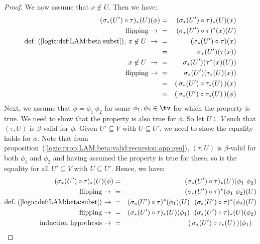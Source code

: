 \begin{proof}
    We now assume that $x\not\in U$. Then we have:
        \begin{eqnarray*}(\sigma_{*}(U')\circ\tau)_{*}(U)(\phi)
            &=&(\sigma_{*}(U')\circ\tau)_{*}(U)(x)\\
            \mbox{flipping\ $\to$\ }
            &=&(\sigma_{*}(U')\circ\tau)^{*}(x)(U)\\
            \mbox{def.~(\ref{logic:def:LAM:beta:subst}), $x\not\in U\ \to\ $}
            &=&(\sigma_{*}(U')\circ\tau)(x)\\
            &=&\sigma_{*}(U')(\tau(x))\\
            \mbox{$x\not\in U\ \to\ $}
            &=&\sigma_{*}(U')(\tau^{*}(x)(U))\\
            \mbox{flipping\ $\to$\ }
            &=&\sigma_{*}(U')(\tau_{*}(U)(x))\\
            &=&(\,\sigma_{*}(U')\circ\tau_{*}(U)\,)(x)\\
            &=&(\,\sigma_{*}(U')\circ\tau_{*}(U)\,)(\phi)
        \end{eqnarray*}
    Next, we assume that $\phi=\phi_{1}\ \phi_{2}$ for some $\phi_{1},\phi_{2}
    \in\tv$ for which the property is true. We need to show that the
    property is also true for $\phi$. So let $U\subseteq V$ such that 
    $(\tau, U)$ is $\beta$-valid for $\phi$. Given $U'\subseteq V$ with
    $U\subseteq U'$, we need to show the equality holds for $\phi$. Note that 
    from proposition~(\ref{logic:prop:LAM:beta:valid:recursion:app:gen}), 
    $(\tau,U)$ is $\beta$-valid for both $\phi_{1}$ and $\phi_{2}$ and 
    having assumed the property is true for these, so is the equality for
    all $U'\subseteq V$ with $U\subseteq U'$. Hence, we have:
        \begin{eqnarray*}(\sigma_{*}(U')\circ\tau)_{*}(U)(\phi)
            &=&(\sigma_{*}(U')\circ\tau)_{*}(U)(\phi_{1}\ \phi_{2})\\
            \mbox{flipping\ $\to$\ }
            &=&(\sigma_{*}(U')\circ\tau)^{*}(\phi_{1}\ \phi_{2})(U)\\
            \mbox{def.~(\ref{logic:def:LAM:beta:subst})\ $\to$\ }
            &=&(\sigma_{*}(U')\circ\tau)^{*}(\phi_{1})(U)\ \ 
               (\sigma_{*}(U')\circ\tau)^{*}(\phi_{2})(U)\\
            \mbox{flipping\ $\to$\ }
            &=&(\sigma_{*}(U')\circ\tau)_{*}(U)(\phi_{1})\ \ 
               (\sigma_{*}(U')\circ\tau)_{*}(U)(\phi_{2})\\
            \mbox{induction hypothesis$\ \to\ $}
            &=&(\,\sigma_{*}(U')\circ\tau_{*}(U)\,)(\phi_{1})\ \ 

\end{eqnarray*}
\end{proof}
